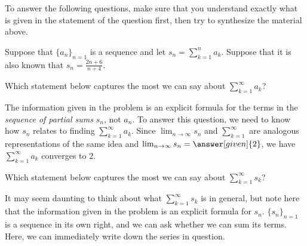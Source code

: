 \documentclass{ximera}
\begin{document}
To answer the following questions, make sure that you understand exactly what is given in the statement of the question first, then try to synthesize the material above.

\begin{example}
Suppose that $\{a_n\}_{n=1}$ is a sequence and let $s_n = \sum_{k=1}^{n} a_k$.  Suppose that it is also known that $s_n = \frac{2n+6}{n+4}$.

\begin{question}
Which statement below captures the most we can say about $\sum_{k=1}^{\infty} a_k$? 

\begin{multipleChoice}
\end{multipleChoice}

\begin{feedback}
The information given in the problem is an explicit formula for the terms in the \emph{sequence of partial sums} $s_n$, not $a_n$.  To answer this question, we need to know how $s_n$ relates to finding $\sum_{k=1}^{\infty} a_k$.  Since $\lim_{n \to \infty} s_n$ and $\sum_{k=1}^{\infty}$ are analogous representations of the same idea and $\lim_{n \to \infty} s_n = \answer[given]{2}$, we have $\sum_{k=1}^{\infty} a_k$ converges to $2$. 
\end{feedback}
\end{question}
\begin{question}
Which statement below captures the most we can say about $\sum_{k=1}^{\infty} s_k$? 

\begin{multipleChoice}
\end{multipleChoice}

\begin{feedback}
It may seem daunting to think about what $\sum_{k=1}^{\infty} s_k$ is in general, but note here that the information given in the problem is an explicit formula for $s_n$.  $\{s_n\}_{n=1}$ is a sequence in its own right, and we can ask whether we can sum its terms.  Here, we can immediately write down the series in question.


\end{feedback}
\end{question}
\end{example}
\end{document}
